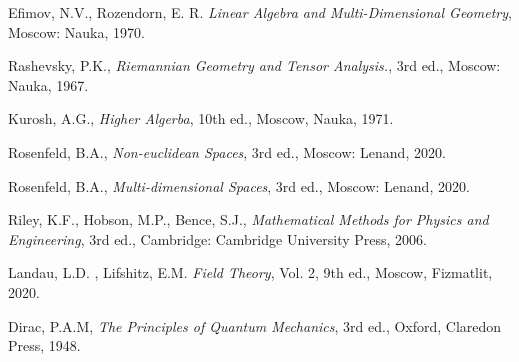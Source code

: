 \documentclass{book}
\begin{document}
\begin{thebibliography}{}
Efimov, N.V., Rozendorn, E. R. \emph{Linear Algebra and Multi-Dimensional Geometry}, Moscow: Nauka, 1970.

Rashevsky, P.K., \emph{Riemannian Geometry and Tensor Analysis.}, 3rd ed., Moscow: Nauka, 1967.
   
Kurosh, A.G., \emph{Higher Algerba}, 10th ed., Moscow, Nauka, 1971. 

   Rosenfeld, B.A.,  \emph{Non-euclidean Spaces}, 3rd ed., Moscow: Lenand, 2020.

Rosenfeld, B.A.,  \emph{Multi-dimensional Spaces}, 3rd ed., Moscow: Lenand, 2020.

Riley, K.F., Hobson, M.P., Bence, S.J., \emph{Mathematical Methods for Physics and Engineering}, 3rd ed., Cambridge: Cambridge University Press, 2006.

Landau, L.D. , Lifshitz, E.M. \emph{Field Theory}, Vol. 2, 9th ed., Moscow, Fizmatlit, 2020.

Dirac, P.A.M, \emph{The Principles of Quantum Mechanics}, 3rd ed., Oxford, Claredon Press, 1948.


\end{thebibliography}
\end{document}
